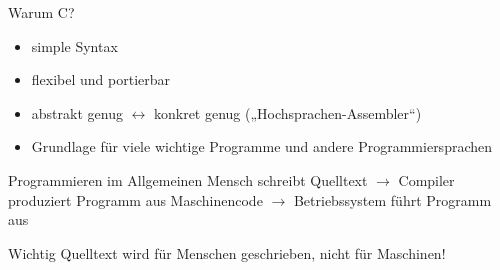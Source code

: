 \documentclass[
  aspectratio=1610,
]{beamer}
\begin{document}
\begin{frame}{Warum C?}
  \begin{itemize}
    \item simple Syntax
    \item flexibel und portierbar
    \item abstrakt genug $\leftrightarrow$ konkret genug („Hochsprachen-Assembler“)
    \item Grundlage für viele wichtige Programme und andere Programmiersprachen
  \end{itemize}
\end{frame}

\begin{frame}{Programmieren im Allgemeinen}
  Mensch schreibt Quelltext
  $\rightarrow$ Compiler produziert Programm aus Maschinencode
  $\rightarrow$ Betriebssystem führt Programm aus

  \pause{}

  \begin{block}{Wichtig}
    Quelltext wird für Menschen geschrieben, nicht für Maschinen!
  \end{block}
\end{frame}
\end{document}
